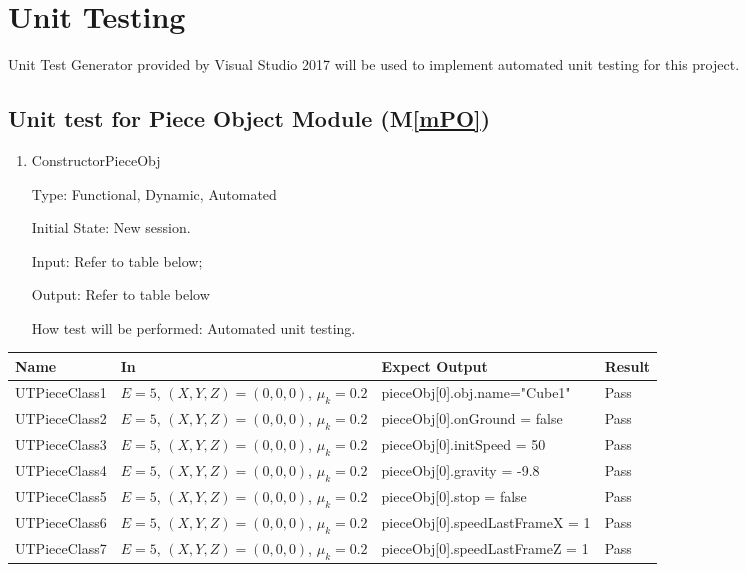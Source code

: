 \documentclass[12pt, titlepage]{article}
\newcommand{\mref}[1]{M\ref{#1}}
\begin{document}
\section{Unit Testing}
\label{Sec_UnitTest}
Unit Test Generator provided by Visual Studio 2017 will be used to implement automated unit testing for this project.

\subsection{Unit test for Piece Object Module (\mref{mPO})}
\label{Sec_UmPO}

\begin{enumerate}	
	\item{ConstructorPieceObj}
	
	Type: Functional, Dynamic, Automated
	
	Initial State: New session.
	
	Input: Refer to table below;
	
	Output: Refer to table below
	
	How test will be performed: Automated unit testing.
\end{enumerate}

\begin{center}
	\begin{tabular}{p{2.5cm} p{4cm} p{6cm} p{4cm}}
		\hline
		\textbf{Name} & \textbf{In} & \textbf{Expect Output} & \textbf{Result} \\
		\hline
		UTPieceClass1 &$E = 5$, $(X,Y,Z) = (0,0,0)$, $\mu_{k} = 0.2$ &pieceObj[0].obj.name="Cube1"&Pass\\
		UTPieceClass2 &$E = 5$, $(X,Y,Z) = (0,0,0)$, $\mu_{k} = 0.2$ &pieceObj[0].onGround = false&Pass\\
		UTPieceClass3 &$E = 5$, $(X,Y,Z) = (0,0,0)$, $\mu_{k} = 0.2$ &pieceObj[0].initSpeed = 50&Pass\\
		UTPieceClass4 &$E = 5$, $(X,Y,Z) = (0,0,0)$, $\mu_{k} = 0.2$ &pieceObj[0].gravity = -9.8&Pass\\
		UTPieceClass5 &$E = 5$, $(X,Y,Z) = (0,0,0)$, $\mu_{k} = 0.2$ &pieceObj[0].stop = false&Pass\\
		UTPieceClass6 &$E = 5$, $(X,Y,Z) = (0,0,0)$, $\mu_{k} = 0.2$ &pieceObj[0].speedLastFrameX = 1&Pass\\
		UTPieceClass7 &$E = 5$, $(X,Y,Z) = (0,0,0)$, $\mu_{k} = 0.2$ &pieceObj[0].speedLastFrameZ = 1&Pass\\
		\hline		
	\end{tabular}
\end{center}
\end{document}
